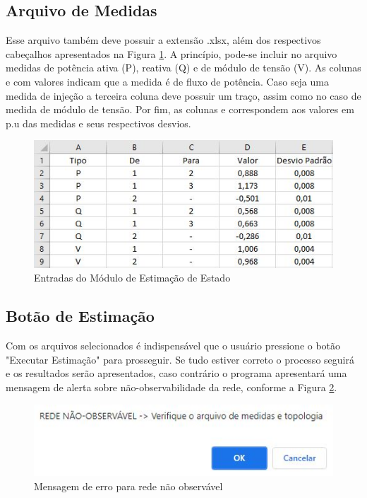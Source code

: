 \documentclass{article}
\begin{document}
\subsection{Arquivo de Medidas}
Esse arquivo também deve possuir a extensão .xlsx, além dos respectivos cabeçalhos apresentados na Figura \ref{fig:arq_meds}. A princípio, pode-se incluir no arquivo medidas de potência ativa (P), reativa (Q) e de módulo de tensão (V).
As colunas  e  com valores indicam que a medida é de fluxo de potência. 
Caso seja uma medida de injeção  a terceira coluna deve possuir um traço, assim como no caso de medida de módulo de tensão. Por fim, as colunas  e  correspondem aos valores em p.u das medidas e seus respectivos desvios.   
\begin{figure}[H]
    \centering
    \includegraphics[scale=.7]{Imagens/Foto_Arquivo_de_Medidas.JPG}
    \caption{Entradas do Módulo de Estimação de Estado}
    \label{fig:arq_meds}
\end{figure}

\subsection{Botão de Estimação}
Com os arquivos selecionados é indispensável que o usuário pressione o botão "Executar Estimação" para prosseguir. Se tudo estiver correto o processo seguirá e os resultados serão apresentados, caso contrário o programa apresentará uma mensagem de alerta sobre não-observabilidade da rede, conforme a Figura \ref{fig:Pop_obs}. 

\begin{figure}[H]
    \centering
    \includegraphics[scale = .7]{Imagens/Pop-up_Observabilidade.JPG}
    \caption{Mensagem de erro para rede não observável}
    \label{fig:Pop_obs}
\end{figure}
\end{document}
